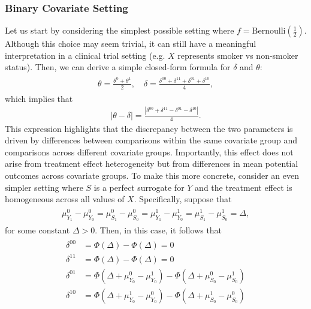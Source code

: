 \documentclass[12pt]{article}
\begin{document}
\subsubsection{Binary Covariate Setting}
\label{subsec:binary_covariate_setting}

Let us start by considering the simplest possible setting where \(f = \text{Bernoulli} \left( \frac{1}{2} \right) \). Although this choice may seem trivial, it can still have a meaningful interpretation in a clinical trial setting (e.g. \(X\) represents smoker vs non-smoker status). Then, we can derive a simple closed-form formula for \(\delta\) and \(\theta\):
\begin{align}
    \begin{split}
        \theta = \frac{\theta^{0} + \theta^{1}}{2}, \quad \delta = \frac{\delta^{00} + \delta^{11} + \delta^{01} + \delta^{10}}{4},
    \end{split}
\end{align}
which implies that
\begin{align}
    | \theta - \delta | = \frac{ \left| \delta^{00} + \delta^{11} - \delta^{01} - \delta^{10} \right| }{4}.
\end{align}
This expression highlights that the discrepancy between the two parameters is driven by differences between comparisons within the same covariate group and comparisons across different covariate groups. Importantly, this effect does not arise from treatment effect heterogeneity but from differences in mean potential outcomes across covariate groups. To make this more concrete, consider an even simpler setting where \(S\) is a perfect surrogate for \(Y\) and the treatment effect is homogeneous across all values of \(X\). Specifically, suppose that
\begin{align}
    \begin{split}
        \mu^{0}_{Y_{1}} - \mu^{0}_{Y_{0}} =
        \mu^{0}_{S_{1}} - \mu^{0}_{S_{0}} =
        \mu^{1}_{Y_{1}} - \mu^{1}_{Y_{0}} =
        \mu^{1}_{S_{1}} - \mu^{1}_{S_{0}} = \Delta,
    \end{split}
\end{align}
for some constant \(\Delta > 0\). Then, in this case, it follows that
\begin{align}
    \begin{split}
        \delta^{00} & = \Phi(\Delta) - \Phi(\Delta) = 0 \\
        \delta^{11} & = \Phi(\Delta) - \Phi(\Delta) = 0 \\
        \delta^{01} & = \Phi(\Delta + \mu^{0}_{Y_{0}} - \mu^{1}_{Y_{0}}) - \Phi(\Delta + \mu^{0}_{S_{0}} - \mu^{1}_{S_{0}}) \\
        \delta^{10} & = \Phi(\Delta + \mu^{1}_{Y_{0}} - \mu^{0}_{Y_{0}}) - \Phi(\Delta + \mu^{1}_{S_{0}} - \mu^{0}_{S_{0}})
    \end{split}
\end{align}
\end{document}
